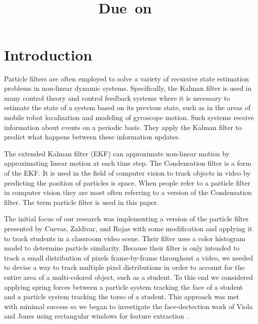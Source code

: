 \documentclass[12pt]{article}
\title{
  \vspace{2in}
  \textmd{\textbf{\hmwkTitle}} \\
  \vspace{0.1in}
  \large{\textmd{\hmwkClassInstructor}} \\
  \vspace{0.1in}
  \normalsize\small{Due\ on\ \hmwkDueDate} \\
  \vspace{3in}
}
\date{} %
\author{\textbf{\hmwkAuthorName}}
\begin{document}
\maketitle
\thispagestyle{empty}

\newpage %

\section{Introduction}

Particle filters are often employed to solve a variety of recursive state estimation problems in non-linear dynamic systems. Specifically, the Kalman filter is used in many control theory and control feedback systems where it is necessary to estimate the state of a system based on its previous state, such as in the areas of mobile robot localization and modeling of gyroscope motion. Such systems receive information about events on a periodic basis. They apply the Kalman filter to predict what happens between these information updates.

The extended Kalman filter (EKF) can approximate non-linear motion by approximating linear motion at each time step. The Condensation filter is a form of the EKF. It is used in the field of computer vision to track objects in video by predicting the position of particles is space. When people refer to a particle filter in computer vision they are most often referring to a version of the Condensation filter. The term particle filter is used in this paper.

The initial focus of our research was implementing a version of the particle filter presented by Cuevas,  Zaldivar, and Rojas \cite{particle} with some modification and applying it to track students in a classroom video scene. Their filter uses a color histogram model to determine particle similarity. Because their filter is only intended to track a small distribution of pixels frame-by-frame throughout a video, we needed to devise a way to track multiple pixel distributions in order to account for the entire area of a multi-colored object, such as a student. To this end we considered applying spring forces between a particle system tracking the face of a student and a particle system tracking the torso of a student. This approach was met with minimal success so we began to investigate the face-dectection work of Viola and Jones using rectangular windows for feature extraction \cite{facedetection}.
\end{document}
